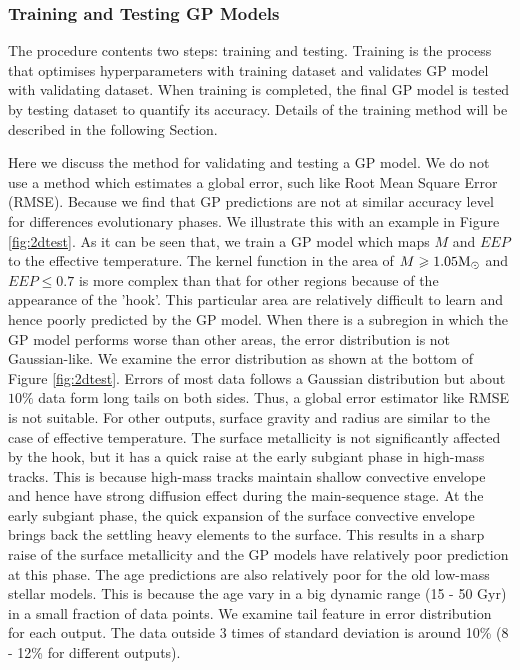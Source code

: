 \subsubsection{Training and Testing GP Models}\label{sec:training}

The procedure contents two steps: training and testing.  
Training is the process that optimises hyperparameters with training dataset and validates GP model with validating dataset. When training is completed, the final GP model is tested by testing dataset to quantify its accuracy.  Details of the training method will be described in the following Section. 

Here we discuss the method for validating and testing a GP model. We do not use a method which estimates a global error, such like Root Mean Square Error (RMSE). Because we find that GP predictions are not at similar accuracy level for differences evolutionary phases.
%
We illustrate this with an example in Figure \ref{fig:2dtest}. As it can be seen that, we train a GP model which maps $M$ and $EEP$ to the effective temperature. The kernel function in the area of $M \geq 1.05 {\rm M_{\odot}}$ and $EEP \leq 0.7$ is more complex than that for other regions because of the appearance of the 'hook'. This particular area are relatively difficult to learn and hence poorly predicted by the GP model.
When there is a subregion in which the GP model performs worse than other areas, the error distribution is not Gaussian-like. We examine the error distribution as shown at the bottom of Figure \ref{fig:2dtest}. Errors of most data follows a Gaussian distribution but about $10\%$ data form long tails on both sides. Thus, a global error estimator like RMSE is not suitable. 
%
For other outputs, surface gravity and radius are similar to the case of effective temperature. The surface metallicity is not significantly affected by the hook, but it has a quick raise at the early subgiant phase in high-mass tracks. This is because high-mass tracks maintain shallow convective envelope and hence have strong diffusion effect during the main-sequence stage. At the early subgiant phase, the quick expansion of the surface convective envelope brings back the settling heavy elements to the surface. This results in a sharp raise of the surface metallicity and the GP models have relatively poor prediction at this phase.
%
The age predictions are also relatively poor for the old low-mass stellar models. This is because the age vary in a big dynamic range (15 - 50 Gyr) in a small fraction of data points.        
%
We examine tail feature in error distribution for each output. The data outside 3 times of standard deviation is around 10\% (8 - 12\% for different outputs).  
